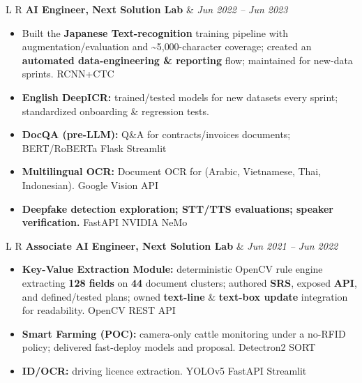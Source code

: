 \documentclass[10pt,letterpaper]{article}
\newcommand{\pill}[1]{%
  \begingroup\setlength{\fboxsep}{1.2pt}%
  \colorbox{brandblue!12}{\textcolor{brandblue}{\scriptsize #1}}%
  \endgroup
}
\begin{document}
\vspace{5pt}
\begin{tabularx}{\linewidth}{L R}
\fontsize{12}{10}\selectfont\textbf{AI Engineer, Next Solution Lab} & \textit{Jun 2022 -- Jun 2023} \\
\end{tabularx}
\begin{itemize}
  \item Built the \textbf{Japanese Text-recognition} training pipeline with augmentation/evaluation and \textasciitilde5{,}000-character coverage; created an \textbf{automated data-engineering \& reporting} flow; maintained for new-data sprints. \pill{RCNN+CTC}
  \item \textbf{English DeepICR:} trained/tested models for new datasets every sprint; standardized onboarding \& regression tests.
  \item \textbf{DocQA (pre-LLM):} Q\&A for contracts/invoices documents; \pill{BERT/RoBERTa} \pill{Flask} \pill{Streamlit}
  \item \textbf{Multilingual OCR:} Document OCR for (Arabic, Vietnamese, Thai, Indonesian). \pill{Google Vision API}
  \item \textbf{Deepfake detection exploration; STT/TTS evaluations; speaker verification.} \pill{FastAPI} \pill{NVIDIA NeMo}
\end{itemize}

\vspace{5pt}
\begin{tabularx}{\linewidth}{L R}
\fontsize{12}{10}\selectfont\textbf{Associate AI Engineer, Next Solution Lab} & \textit{Jun 2021 -- Jun 2022} \\
\end{tabularx}
\begin{itemize}
  \item \textbf{Key-Value Extraction Module:} deterministic OpenCV rule engine extracting \textbf{128 fields} on \textbf{44} document clusters; authored \textbf{SRS}, exposed \textbf{API}, and defined/tested plans; owned \textbf{text-line} \& \textbf{text-box update} integration for readability. \pill{OpenCV} \pill{REST API}
  \item \textbf{Smart Farming (POC):} camera-only cattle monitoring under a no-RFID policy; delivered fast-deploy models and proposal. \pill{Detectron2} \pill{SORT}
  \item \textbf{ID/OCR:} driving licence extraction. \pill{YOLOv5} \pill{FastAPI} \pill{Streamlit}
\end{itemize}
\end{document}
